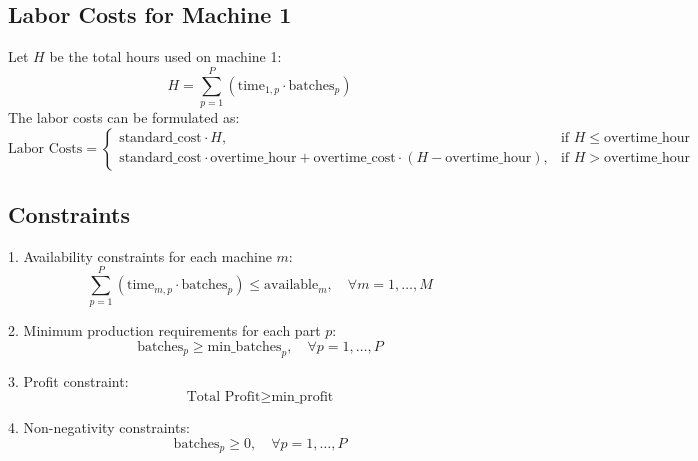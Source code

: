 \documentclass{article}
\begin{document}
\subsection*{Labor Costs for Machine 1}
Let \( H \) be the total hours used on machine 1:
\[
H = \sum_{p=1}^{P} (\text{time}_{1,p} \cdot \text{batches}_{p})
\]
The labor costs can be formulated as:
\[
\text{Labor Costs} =
\begin{cases}
\text{standard\_cost} \cdot H, & \text{if } H \leq \text{overtime\_hour} \\
\text{standard\_cost} \cdot \text{overtime\_hour} + \text{overtime\_cost} \cdot (H - \text{overtime\_hour}), & \text{if } H > \text{overtime\_hour}
\end{cases}
\]

\subsection*{Constraints}
1. Availability constraints for each machine \( m \):
\[
\sum_{p=1}^{P} (\text{time}_{m,p} \cdot \text{batches}_{p}) \leq \text{available}_{m}, \quad \forall m = 1, \ldots, M
\]

2. Minimum production requirements for each part \( p \):
\[
\text{batches}_{p} \geq \text{min\_batches}_{p}, \quad \forall p = 1, \ldots, P
\]

3. Profit constraint:
\[
\text{Total Profit} \geq \text{min\_profit}
\]

4. Non-negativity constraints:
\[
\text{batches}_{p} \geq 0, \quad \forall p = 1, \ldots, P
\]
\end{document}

